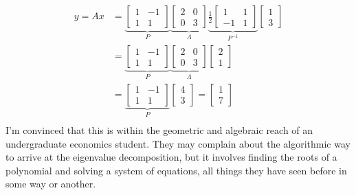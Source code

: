 \documentclass[graybox]{svmult}
\begin{document}
\begin{align*}
y = Ax &= \underbrace{\left[\begin{array}{cc} 1 & -1 \\ 1 & 1\end{array}\right]}_{P} \underbrace{\left[\begin{array}{cc} 2 & 0 \\ 0 & 3\end{array}\right]}_{\Lambda} \underbrace{\frac{1}{2} \left[\begin{array}{cc} 1 & 1 \\ -1 & 1\end{array}\right]}_{P^{-1}} \left[\begin{array}{c}
1 \\ 3
\end{array}\right] \\
&= \underbrace{\left[\begin{array}{cc} 1 & -1 \\ 1 & 1\end{array}\right]}_{P} \underbrace{\left[\begin{array}{cc} 2 & 0 \\ 0 & 3\end{array}\right]}_{\Lambda} \left[\begin{array}{c}
2 \\ 1
\end{array}\right]\\
&= \underbrace{\left[\begin{array}{cc} 1 & -1 \\ 1 & 1\end{array}\right]}_{P}  \left[\begin{array}{c}
4 \\ 3
\end{array}\right] = \left[\begin{array}{c}
1 \\ 7
\end{array}\right]\\
\end{align*}
I'm convinced that this is within the geometric and algebraic reach of an undergraduate economics student. They may complain about the algorithmic way to arrive at the eigenvalue decomposition, but it involves finding the roots of a polynomial and solving a system of equations, all things they have seen before in some way or another.
\end{document}
